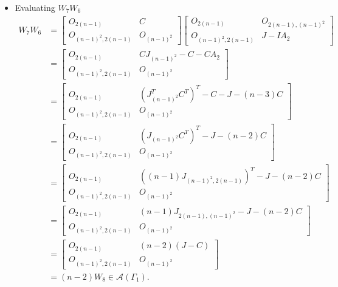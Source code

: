 \begin{itemize}
    \item Evaluating $W_7W_6$
    \begin{align*}
        W_7W_6
        &= \begin{bmatrix}
            O_{2(n-1)} & C \\
            O_{(n-1)^2, 2(n-1)} & O_{(n-1)^2}
        \end{bmatrix}\begin{bmatrix}
            O_{2(n-1)} & O_{2(n-1), (n-1)^2} \\
            O_{(n-1)^2, 2(n-1)} & J-IA_2
        \end{bmatrix}\\
        &= \begin{bmatrix}
            O_{2(n-1)} & CJ_{(n-1)^2} -C-CA_2 \\
            O_{(n-1)^2, 2(n-1)} & O_{(n-1)^2}
        \end{bmatrix}\\
        &= \begin{bmatrix}
            O_{2(n-1)} & (J_{(n-1)^2}^TC^T)^T -C-J - (n-3)C \\
            O_{(n-1)^2, 2(n-1)} & O_{(n-1)^2}
        \end{bmatrix}\\
        &= \begin{bmatrix}
            O_{2(n-1)} & (J_{(n-1)^2}C^T)^T -J - (n-2)C \\
            O_{(n-1)^2, 2(n-1)} & O_{(n-1)^2}
        \end{bmatrix}\\
        &= \begin{bmatrix}
            O_{2(n-1)} & ((n-1)J_{(n-1)^2,2(n-1)})^T -J - (n-2)C \\
            O_{(n-1)^2, 2(n-1)} & O_{(n-1)^2}
        \end{bmatrix}\\
        &= \begin{bmatrix}
            O_{2(n-1)} & (n-1)J_{2(n-1), (n-1)^2} -J - (n-2)C \\
            O_{(n-1)^2, 2(n-1)} & O_{(n-1)^2}
        \end{bmatrix}\\
        &= \begin{bmatrix}
            O_{2(n-1)} & (n-2)(J-C) \\
            O_{(n-1)^2, 2(n-1)} & O_{(n-1)^2}
        \end{bmatrix}\\
        &= (n-2)W_8\in\mathcal{A}(\Gamma_1).
    \end{align*}
    

\end{itemize}
